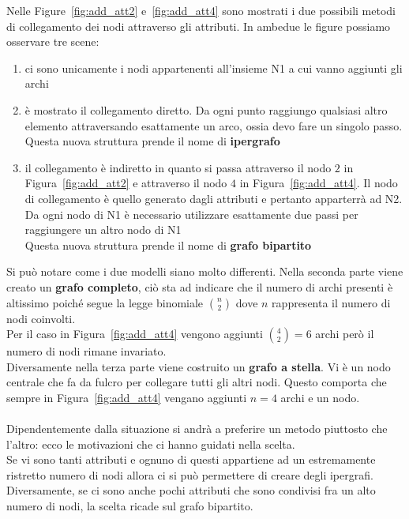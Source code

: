 %
Nelle Figure~\ref{fig:add_att2} e~\ref{fig:add_att4} sono mostrati i due possibili metodi di collegamento dei nodi attraverso gli attributi. In ambedue le figure possiamo osservare tre scene:
\begin{enumerate}
	\item ci sono unicamente i nodi appartenenti all'insieme N1 a cui vanno aggiunti gli archi
	\item è mostrato il collegamento diretto. Da ogni punto raggiungo qualsiasi altro elemento attraversando esattamente un arco, ossia devo fare un singolo passo.\\
	Questa nuova struttura prende il nome di \textbf{ipergrafo}
	\item il collegamento è indiretto in quanto si passa attraverso il nodo $2$ in Figura~\ref{fig:add_att2} e attraverso il nodo $4$ in Figura~\ref{fig:add_att4}. Il nodo di collegamento è quello generato dagli attributi e pertanto apparterrà ad N2.\\
	Da ogni nodo di N1 è necessario utilizzare esattamente due passi per raggiungere un altro nodo di N1\\
	Questa nuova struttura prende il nome di \textbf{grafo bipartito}
\end{enumerate}
%
Si può notare come i due modelli siano molto differenti. Nella seconda parte viene creato un \textbf{grafo completo}, ciò sta ad indicare che il numero di archi presenti è altissimo poiché segue la legge binomiale $ \binom{n}{2}$ dove $n$ rappresenta il numero di nodi coinvolti.\\
Per il caso in Figura~\ref{fig:add_att4} vengono aggiunti $ \binom{4}{2} = 6$ archi però il numero di nodi rimane invariato.\\
Diversamente nella terza parte viene costruito un \textbf{grafo a stella}. Vi è un nodo centrale che fa da fulcro per collegare tutti gli altri nodi. Questo comporta che sempre in Figura~\ref{fig:add_att4} vengano aggiunti $n=4$ archi e un nodo.\\
\\
Dipendentemente dalla situazione si andrà a preferire un metodo piuttosto che l'altro: ecco le motivazioni che ci hanno guidati nella scelta.\\
Se vi sono tanti attributi e ognuno di questi appartiene ad un estremamente ristretto numero di nodi allora ci si può permettere di creare degli ipergrafi. Diversamente, se ci sono anche pochi attributi che sono condivisi fra un alto numero di nodi, la scelta ricade sul grafo bipartito.\\
